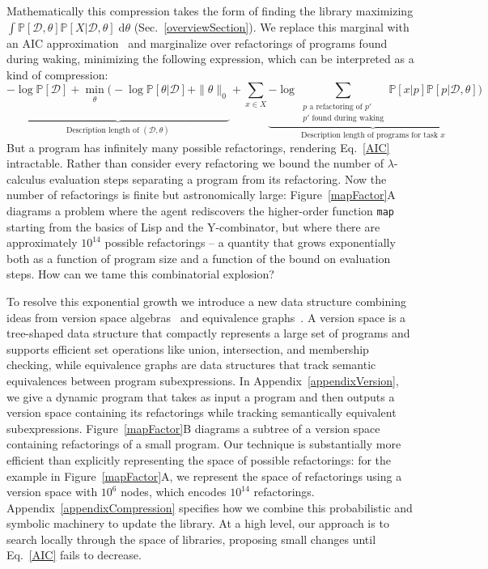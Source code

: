 \documentclass{article}
\newcommand{\code}[1]{{\footnotesize\texttt{#1}}}
\newcommand{\probability}{\mathds{P}} %
\begin{document}
Mathematically this compression takes the form of
finding the library maximizing $\int \probability[\mathcal{D},\theta]\probability[X|\mathcal{D},\theta]\;\mathrm{d}\theta$ (Sec.~\ref{overviewSection}).
We replace this marginal with an AIC approximation~\cite{akaike1998information}
and marginalize over refactorings of programs found during waking, minimizing the following expression,
which can be interpreted as a kind of compression:
\begin{equation}
\underbrace{-\log \probability[\mathcal{D}] + \min_{\substack{\theta\\\\\\\\}}\Bigg(-\log
\probability[\theta|\mathcal{D}] + \|\theta\|_0}_{\text{Description length of }(\mathcal{D},\theta)} +\sum_{x\in
  X}\underbrace{-\log \sum_{\substack{p \text{ a refactoring of } p'\\ p'\text{ found during waking}}}\probability[x|p]\probability[p|\mathcal{D},\theta]}_{\text{Description length of programs for task }x}\Bigg)
\label{AIC}
\end{equation}
But a program has infinitely many possible refactorings, rendering
Eq.~\ref{AIC} intractable.  Rather than consider every refactoring we
bound the number of $\lambda$-calculus evaluation steps separating a
program from its refactoring.  Now the number of refactorings is
finite but astronomically large: Figure~\ref{mapFactor}A diagrams a
problem where the agent rediscovers the higher-order function
\code{map} starting from the basics of Lisp and the Y-combinator, but
where there are approximately $10^{14}$ possible refactorings -- a quantity
that grows exponentially both as a function of program size and a
function of the bound on evaluation steps. How can we tame this
combinatorial explosion?

To resolve this exponential growth we introduce a new data structure
combining ideas from version space
algebras~\cite{lau2001programming,mitchell1977version,polozov2015flashmeta}
and equivalence graphs~\cite{tate2009equality}. A version space is a
tree-shaped data structure that compactly represents a large set of
programs and supports efficient set operations like union,
intersection, and membership checking, while equivalence graphs are
data structures that track semantic equivalences between program
subexpressions.  In Appendix~\ref{appendixVersion}, we give a dynamic
program that takes as input a program and then outputs a version space
containing its refactorings while tracking semantically equivalent
subexpressions. Figure~\ref{mapFactor}B diagrams a subtree of a
version space containing refactorings of a small program. Our
technique is substantially more efficient than explicitly representing
the space of possible refactorings: for the example in
Figure~\ref{mapFactor}A, we represent the space of refactorings using
a version space with $10^6$ nodes, which encodes $10^{14}$
refactorings. Appendix~\ref{appendixCompression} specifies how we
combine this probabilistic and symbolic machinery to update the library.
At a high level, our approach is to search locally through the space
of libraries, proposing small changes until Eq.~\ref{AIC} fails to
decrease.
\end{document}
